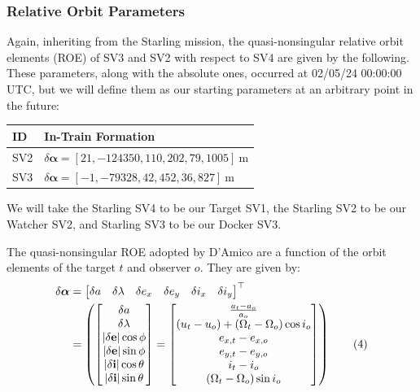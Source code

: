 \subsubsection{Relative Orbit Parameters}\label{sec:ROE_init}
Again, inheriting from the Starling mission, the quasi-nonsingular relative orbit elements (ROE) of SV3 and SV2 with respect to SV4 are given by the following. These parameters, along with the absolute ones, occurred at 02/05/24 00:00:00 UTC, but we will define them as our starting parameters at an arbitrary point in the future: 
\begin{table}[h!]
\centering
\begin{tabular}{ll}
\toprule
\textbf{ID} & \textbf{In-Train Formation} \\
\midrule
SV2 & $\delta\boldsymbol{\alpha} = [21, -124350, 110, 202, 79, 1005]~\text{m}$ \\
SV3 & $\delta\boldsymbol{\alpha} = [-1, -79328, 42, 452, 36, 827]~\text{m}$ \\
\bottomrule
\end{tabular}
\end{table}

We will take the Starling SV4 to be our Target SV1, the Starling SV2 to be our Watcher SV2, and Starling SV3 to be our Docker SV3. 

The quasi-nonsingular ROE adopted by D'Amico \cite{damicothesis} are a function of the orbit elements of the target $t$ and observer $o$. They are given by:
\begin{align}
\delta \boldsymbol{\alpha} &= 
\begin{bmatrix}
\delta a & \delta \lambda & \delta e_x & \delta e_y & \delta i_x & \delta i_y
\end{bmatrix}^\top \notag \\
&= 
\left( 
\begin{bmatrix}
\delta a \\
\delta \lambda \\
|\delta\mathbf{e}| \cos \phi \\
|\delta\mathbf{e}| \sin \phi \\
|\delta\mathbf{i}| \cos \theta \\
|\delta\mathbf{i}| \sin \theta
\end{bmatrix}
= 
\begin{bmatrix}
\frac{a_t - a_o}{a_o} \\
(u_t - u_o) + (\Omega_t - \Omega_o) \cos i_o \\
e_{x,t} - e_{x,o} \\
e_{y,t} - e_{y,o} \\
i_t - i_o \\
(\Omega_t - \Omega_o) \sin i_o
\end{bmatrix}
\right) \tag{4}
\end{align}

